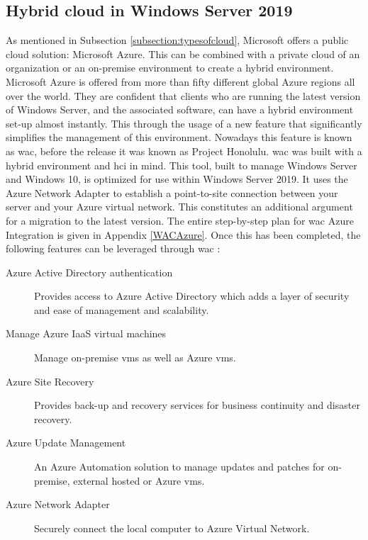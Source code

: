 \subsection{Hybrid cloud in Windows Server 2019}
\label{hybrid-cloud-windows-server-2019}
As mentioned in Subsection \ref{subsection:typesofcloud}, Microsoft offers a public cloud solution: Microsoft Azure. 
This can be combined with a private cloud of an organization or an on-premise environment to create a hybrid environment. 
Microsoft Azure is offered from more than fifty different global Azure regions all over the world. 
They are confident that clients who are running the latest version of Windows Server, and the associated software, can have a hybrid environment set-up almost instantly. 
This through the usage of a new feature that significantly simplifies the management of this environment. 
Nowadays this feature is known as \acrfull{wac}, before the release it was known as Project Honolulu. 
\acrlong{wac} was built with a hybrid environment and \acrshort{hci} in mind. 
This tool, built to manage Windows Server and Windows 10, is optimized for use within Windows Server 2019. 
It uses the Azure Network Adapter to establish a point-to-site connection between your server and your Azure virtual network. 
This constitutes an additional argument for a migration to the latest version. 
The entire step-by-step plan for \acrlong{wac} Azure Integration is given in Appendix \ref{WACAzure}. 
Once this has been completed, the following features can be leveraged through \acrlong{wac} \autocite{Washburn2018}:

\begin{description}
\item [Azure Active Directory authentication] Provides access to Azure Active Directory which adds a layer of security and ease of management and scalability.
\item [Manage Azure IaaS virtual machines] Manage on-premise \acrshort{vm}s as well as Azure \acrshort{vm}s.
\item [Azure Site Recovery] Provides back-up and recovery services for business continuity and disaster recovery.
\item [Azure Update Management] An Azure Automation solution to manage updates and patches for on-premise, external hosted or Azure \acrshort{vm}s.
\item [Azure Network Adapter] Securely connect the local computer to Azure Virtual Network.
\end{description}

